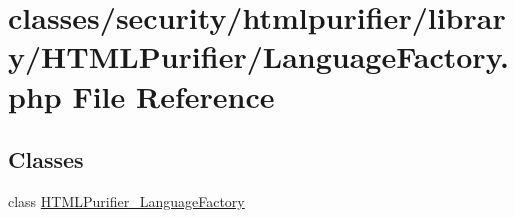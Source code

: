 \hypertarget{LanguageFactory_8php}{\section{classes/security/htmlpurifier/library/\+H\+T\+M\+L\+Purifier/\+Language\+Factory.php File Reference}
\label{LanguageFactory_8php}
}
\subsection*{Classes}
\begin{DoxyCompactItemize}
\item 
class \hyperlink{classHTMLPurifier__LanguageFactory}{H\+T\+M\+L\+Purifier\+\_\+\+Language\+Factory}
\end{DoxyCompactItemize}
